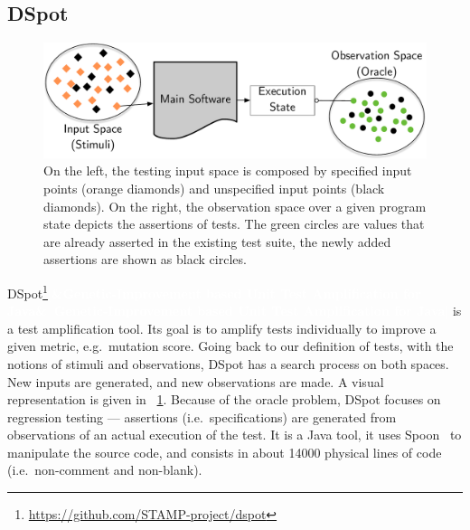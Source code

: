\documentclass[a4paper,11pt]{sdm_internship}
\newcommand{\addref}[1]{\colorbox{TealBlue!100}{\textcolor{white}{\textbf{$[$\ifx&#1&\ \else#1\fi$]$}}}}
\newcommand{\dspot}{DSpot\xspace}
\theoremstyle{definition}
\begin{document}
\subsection{\dspot{}}%
\label{ssec:dspot}

\begin{figure}
  \centering
  \includegraphics[width=36em]{spaces_report}
  \caption{On the left, the testing input space is composed by specified input points (orange diamonds) and unspecified input points (black diamonds). On the right, the observation space over a given program state depicts the assertions of tests. The green circles are values that are already asserted in the existing test suite, the newly added assertions are shown as black circles.}%
\label{fig:spaces}
\end{figure}

\dspot{}\footnote{\url{https://github.com/STAMP-project/dspot}}\addref{Genetic-Improvement based Unit Test Amplification for Java}\cite{baudry2015automatic,baudry2014tailored,baudry2015dspot} is a test amplification tool.
Its goal is to amplify tests individually to improve a given metric, e.g.\ mutation score.
Going back to our definition of tests, with the notions of stimuli and observations, \dspot{} has a search process on both spaces.
New inputs are generated, and new observations are made.
A visual representation is given in \figurename~\ref{fig:spaces}.
Because of the oracle problem, \dspot{} focuses on regression testing --- assertions (i.e.\ specifications) are generated from observations of an actual execution of the test.
It is a Java tool, it uses Spoon~\cite{pawlak2016spoon} to manipulate the source code, and consists in about 14000 physical lines of code (i.e.\ non-comment and non-blank).
\end{document}
